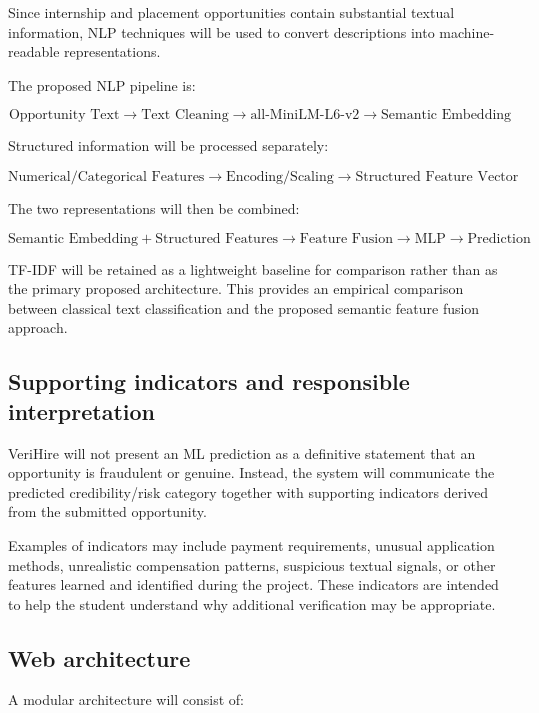 \documentclass[11pt,a4paper]{article}
\newcommand{\BvrHint}[1]{%
  {\normalfont\normalsize\itshape\hfill #1}}
\begin{document}
Since internship and placement opportunities contain substantial textual
information, NLP techniques will be used to convert descriptions into
machine-readable representations.

The proposed NLP pipeline is:

\[
\text{Opportunity Text}
\rightarrow
\text{Text Cleaning}
\rightarrow
\text{all-MiniLM-L6-v2}
\rightarrow
\text{Semantic Embedding}
\]

Structured information will be processed separately:

\[
\text{Numerical/Categorical Features}
\rightarrow
\text{Encoding/Scaling}
\rightarrow
\text{Structured Feature Vector}
\]

The two representations will then be combined:

\[
\text{Semantic Embedding}
+
\text{Structured Features}
\rightarrow
\text{Feature Fusion}
\rightarrow
\text{MLP}
\rightarrow
\text{Prediction}
\]

TF-IDF will be retained as a lightweight baseline for comparison rather than
as the primary proposed architecture. This provides an empirical comparison
between classical text classification and the proposed semantic feature
fusion approach.

\subsection{Supporting indicators and responsible interpretation%
\BvrHint{}}

VeriHire will not present an ML prediction as a definitive statement that an
opportunity is fraudulent or genuine. Instead, the system will communicate
the predicted credibility/risk category together with supporting indicators
derived from the submitted opportunity.

Examples of indicators may include payment requirements, unusual application
methods, unrealistic compensation patterns, suspicious textual signals, or
other features learned and identified during the project. These indicators
are intended to help the student understand why additional verification may
be appropriate.

\subsection{Web architecture%
\BvrHint{}}

A modular architecture will consist of:
\end{document}
